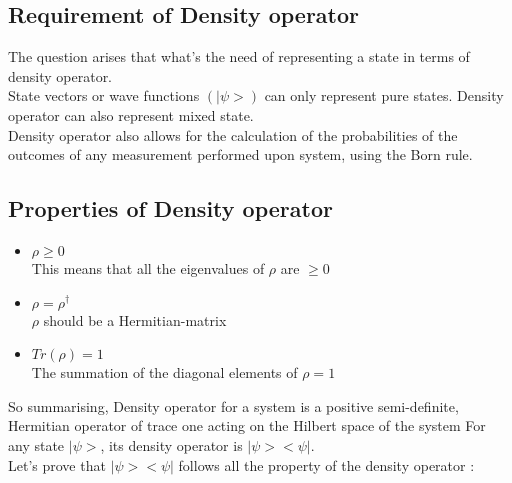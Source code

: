 \documentclass{article}
\begin{document}
\subsection{Requirement of Density operator}
The question arises that what's the need of representing a state in terms of density operator. \\
State vectors or wave functions $(|\psi>)$ can only represent pure states. Density operator can also represent mixed state. \\
Density operator also allows for the calculation of the probabilities of the outcomes of any measurement performed upon system, using the Born rule.
\subsection{Properties of Density operator}
\begin{itemize}
    \item \(\rho \geq 0\) \\
    This means that all the eigenvalues of $\rho$ are $\geq 0$
    \item \(\rho = \rho^\dagger\) \\
    $\rho$ should be a Hermitian-matrix
    \item $Tr(\rho) = 1$ \\
    The summation of the diagonal elements of $\rho = 1$ 
\end{itemize}
So summarising, Density operator for a system is a positive semi-definite, Hermitian operator of trace one acting on the Hilbert space of the system
\newline \newline
For any state $|\psi>$, its density operator is $|\psi><\psi|$.\\
Let's prove that $|\psi><\psi|$ follows all the property of the density operator : \\
\newline
{}
\end{document}
